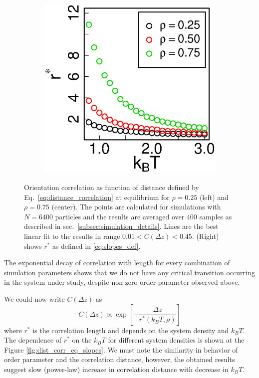 \begin{figure}[t]
\begin{subfigure}[t]{0.32\textwidth}
\end{subfigure}
\begin{subfigure}[t]{0.32\textwidth}
	\centering
	\includegraphics[width=\textwidth]{Images/correlation_length_eq}
\end{subfigure}
	\captionsetup{justification=centering, width=0.9\columnwidth}
	\caption{Orientation correlation as function of distance defined by Eq.~\eqref{eq:distance_correlation} at equilibrium for $\rho = 0.25$ (left) and $\rho = 0.75$ (center). The points are calculated for simulations with $N = 6400$ particles and the results are averaged over $400$ samples as described in sec.~\ref{subsec:simulation_details}. Lines are the best linear fit to the results in range $0.01 < C(\Delta z) < 0.45$. (Right) shows $r^*$ as defined in \eqref{eq:slopes_def}.}
	\label{fig:dist_corr_eq}
\end{figure}

The exponential decay of correlation with length for every combination of simulation parameters shows that we do not have any critical transition occurring in the system under study, despite non-zero order parameter observed above.

We could now write $C(\Delta z)$ as
\begin{equation}
	\label{eq:slopes_def}
	C(\Delta z) \propto \exp\left[-\frac{\Delta z}{r^*(k_BT, \rho)} \right]
\end{equation}
where $r^*$ is the correlation length and depends on the system density and $k_BT$. The dependence of $r^*$ on the $k_BT$ for different system densities is shown at the Figure \ref{fig:dist_corr_eq_slopes}. We must note the similarity in behavior of order parameter and the correlation distance, however, the obtained results suggest slow (power-law) increase in correlation distance with decrease in $k_BT$.

